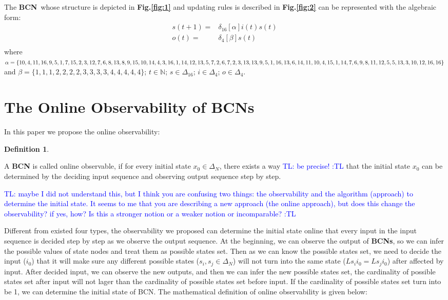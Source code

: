 \documentclass[letterpaper, 10 pt, conference]{ieeeconf}  %
\newtheorem{definition}{Definition}
\def \BCN {{\bf BCN}}
\newcommand{\tl}[1]{\textcolor{blue} {TL: #1 :TL} }
\begin{document}
The \BCN\ whose structure is depicted in {\bf Fig.\ref{fig:1}} and updating rules is described in {\bf Fig.\ref{fig:2}} can be represented with the algebraic form:
\begin{equation}
\begin{split}
s(t+1) =&\delta_{16}[\alpha]i(t)s(t)\\
o(t) =&\delta_4[\beta]s(t)\\
\end{split}
\end{equation}
where $\alpha=\{10,4,11,16,9,5,1, 7,15,2,3,12,7,6,8,13,8,9,\\15,10,14,4,3,16,1,14,12,13,5,7,2,6,7,2,3,13,13,9,5,1,\\16,13 ,6,14,11,10,4,15,1,14 ,7,6,9 ,8,11,12,5,5,13,3,10,\\12,16,16\}$ and $\beta=\{1,1,1,2,2,2,2,3,3,3,3,4,4,4,4,4\}$; $t\in \mathbb{N}$; $s\in \Delta_{16}$; $i\in \Delta_4$; $o\in \Delta_4$.


\section{The Online Observability of BCNs}
In this paper we propose the online observability: 

\begin{definition}
	
\end{definition}

A {\bf BCN} is called online observable, if for every initial state $x_0 \in \Delta_N$, there exists a way \tl{be precise!} that the initial state $x_0 $ can be determined by the deciding input sequence and observing output sequence step by step. 

\tl{maybe I did not understand this, but I think you are confusing two things: the observability and the algorithm (approach) to determine the initial state. It seems to me that you are describing a new approach (the online approach), but does this change the observability? if yes, how? Is this a stronger notion or a weaker notion or incomparable?}

Different from existed four types, the observability we proposed can determine the initial state online that every input in the input sequence is decided step by step as we observe the output sequence. At the beginning, we can observe the output of {\bf BCNs}, so we can infer the possible values of state nodes and treat them as possible states set. Then as we can know the possible states set, we need to decide the input ($i_0$) that it will make sure any different possible states ($s_i, s_j\in \Delta_N$) will not turn into the same state ($Ls_i i_0=Ls_j i_0$) after affected by input. After decided input, we can observe the new outputs, and then we can infer the new possible states set, the cardinality of possible states set after input will not lager than the cardinality of possible states set before input. If the cardinality of possible states set turn into be 1, we can determine the initial state of BCN. The mathematical definition of online observability is given below:
\end{document}
